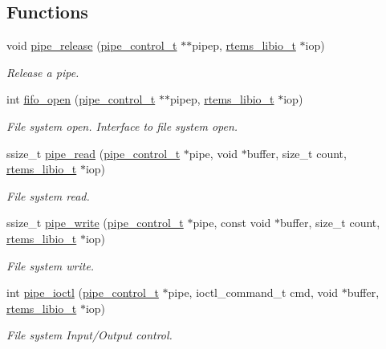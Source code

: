 \subsection*{Functions}
\begin{DoxyCompactItemize}
\item 
void \mbox{\hyperlink{group__FIFO__PIPE_gaeaf913514f36620744271f4c5581d29b}{pipe\+\_\+release}} (\mbox{\hyperlink{structpipe__control}{pipe\+\_\+control\+\_\+t}} $\ast$$\ast$pipep, \mbox{\hyperlink{structrtems__libio__tt}{rtems\+\_\+libio\+\_\+t}} $\ast$iop)
\begin{DoxyCompactList}\small\item\em Release a pipe. \end{DoxyCompactList}\item 
int \mbox{\hyperlink{group__FIFO__PIPE_ga15eb64a7cda614759d385c8f38296ea6}{fifo\+\_\+open}} (\mbox{\hyperlink{structpipe__control}{pipe\+\_\+control\+\_\+t}} $\ast$$\ast$pipep, \mbox{\hyperlink{structrtems__libio__tt}{rtems\+\_\+libio\+\_\+t}} $\ast$iop)
\begin{DoxyCompactList}\small\item\em File system open. Interface to file system open. \end{DoxyCompactList}\item 
ssize\+\_\+t \mbox{\hyperlink{group__FIFO__PIPE_gafac00fefe4986e2357ffdd01a20b6f2e}{pipe\+\_\+read}} (\mbox{\hyperlink{structpipe__control}{pipe\+\_\+control\+\_\+t}} $\ast$pipe, void $\ast$buffer, size\+\_\+t count, \mbox{\hyperlink{structrtems__libio__tt}{rtems\+\_\+libio\+\_\+t}} $\ast$iop)
\begin{DoxyCompactList}\small\item\em File system read. \end{DoxyCompactList}\item 
ssize\+\_\+t \mbox{\hyperlink{group__FIFO__PIPE_gaa3c5b709d15ee5abdfff8552a8052a67}{pipe\+\_\+write}} (\mbox{\hyperlink{structpipe__control}{pipe\+\_\+control\+\_\+t}} $\ast$pipe, const void $\ast$buffer, size\+\_\+t count, \mbox{\hyperlink{structrtems__libio__tt}{rtems\+\_\+libio\+\_\+t}} $\ast$iop)
\begin{DoxyCompactList}\small\item\em File system write. \end{DoxyCompactList}\item 
int \mbox{\hyperlink{group__FIFO__PIPE_ga9b1bcd47d18b2adaeb414e2936a86f70}{pipe\+\_\+ioctl}} (\mbox{\hyperlink{structpipe__control}{pipe\+\_\+control\+\_\+t}} $\ast$pipe, ioctl\+\_\+command\+\_\+t cmd, void $\ast$buffer, \mbox{\hyperlink{structrtems__libio__tt}{rtems\+\_\+libio\+\_\+t}} $\ast$iop)
\begin{DoxyCompactList}\small\item\em File system Input/\+Output control. \end{DoxyCompactList}\end{DoxyCompactItemize}


